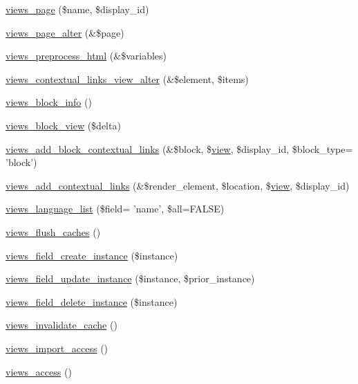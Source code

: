 \begin{DoxyCompactItemize}
\item 
\hyperlink{views_8module_a1cbb11f8adc6fbfecb3a029ab2973cff}{views\_\-page} (\$name, \$display\_\-id)
\item 
\hyperlink{views_8module_a278afcd00ca124837da7016ede4e64b2}{views\_\-page\_\-alter} (\&\$page)
\item 
\hyperlink{views_8module_a625ef34d5fe86fa3eb7152359e819d43}{views\_\-preprocess\_\-html} (\&\$variables)
\item 
\hyperlink{views_8module_ae9e5be1396c0f03114ade9e629d659ee}{views\_\-contextual\_\-links\_\-view\_\-alter} (\&\$element, \$items)
\item 
\hyperlink{views_8module_a394aa81d1c40be16ebc29acb2fdae0fc}{views\_\-block\_\-info} ()
\item 
\hyperlink{views_8module_ae2b10c93b6c54fb61100759aed3b7299}{views\_\-block\_\-view} (\$delta)
\item 
\hyperlink{views_8module_a45becd00bbd9f1fa7e672af1513200d5}{views\_\-add\_\-block\_\-contextual\_\-links} (\&\$block, \$\hyperlink{classview}{view}, \$display\_\-id, \$block\_\-type= 'block')
\item 
\hyperlink{views_8module_ada5efae53eaaac7b5d9a1411aae14138}{views\_\-add\_\-contextual\_\-links} (\&\$render\_\-element, \$location, \$\hyperlink{classview}{view}, \$display\_\-id)
\item 
\hyperlink{views_8module_a1e6f0f91344d0781f385e90f247e5aa8}{views\_\-language\_\-list} (\$field= 'name', \$all=FALSE)
\item 
\hyperlink{views_8module_acb54c1ed22df1323d1191cc3ff0c6891}{views\_\-flush\_\-caches} ()
\item 
\hyperlink{views_8module_a190407236048bea187c49db49f19e9ce}{views\_\-field\_\-create\_\-instance} (\$instance)
\item 
\hyperlink{views_8module_aad19a47ddacc5b8344e42a6ff92b7c4f}{views\_\-field\_\-update\_\-instance} (\$instance, \$prior\_\-instance)
\item 
\hyperlink{views_8module_a62211abcf036f968e40bcf20158f10c4}{views\_\-field\_\-delete\_\-instance} (\$instance)
\item 
\hyperlink{views_8module_a51e180fd9efb14998bb83aa5c9118867}{views\_\-invalidate\_\-cache} ()
\item 
\hyperlink{views_8module_a01c92296a9a5d51e8e5e470068d7cd40}{views\_\-import\_\-access} ()
\item 
\hyperlink{views_8module_a3ecb735baf489bc115f6de9549d8fe81}{views\_\-access} ()
\item 

\end{DoxyCompactItemize}
